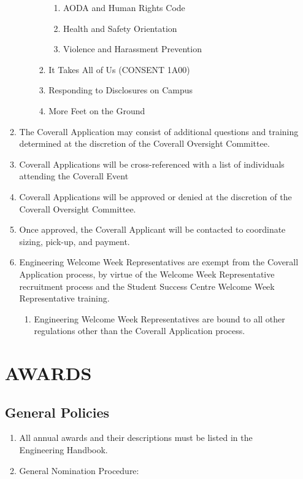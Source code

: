 \begin{enumerate}
\begin{enumerate}
\begin{enumerate}
\begin{enumerate}
      \begin{enumerate}
       \item
        AODA and Human Rights Code
       \item
        Health and Safety Orientation
       \item
        Violence and Harassment Prevention
      \end{enumerate}
     \item
      It Takes All of Us (CONSENT 1A00)
     \item
      Responding to Disclosures on Campus
     \item
      More Feet on the Ground
    \end{enumerate}
  \end{enumerate}
 \item
  The Coverall Application may consist of additional questions and
  training determined at the discretion of the Coverall Oversight
  Committee.
 \item
  Coverall Applications will be cross-referenced with a list of
  individuals attending the Coverall Event
 \item
  Coverall Applications will be approved or denied at the discretion of
  the Coverall Oversight Committee.
 \item
  Once approved, the Coverall Applicant will be contacted to coordinate
  sizing, pick-up, and payment.
 \item
  Engineering Welcome Week Representatives are exempt from the Coverall
  Application process, by virtue of the Welcome Week Representative
  recruitment process and the Student Success Centre Welcome Week
  Representative training.
  \begin{enumerate}
   \item
    Engineering Welcome Week Representatives are bound to all other
    regulations other than the Coverall Application process.
  \end{enumerate}
\end{enumerate}

\hypertarget{awards}{%
 \section{AWARDS}
 \label{awards}}

\hypertarget{general-policies}{%
 \subsection{General Policies}
 \label{general-policies}}
\begin{enumerate}
 \item
  All annual awards and their descriptions must be listed in the
  Engineering Handbook.
 \item
  General Nomination Procedure:


\end{enumerate}
\end{enumerate}
